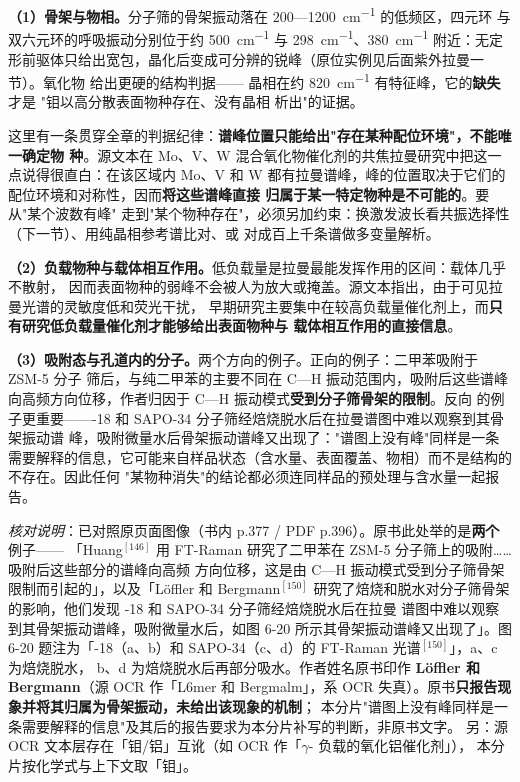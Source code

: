 \textbf{（1）骨架与物相。}分子筛的骨架振动落在 $200$—\qty{1200}{cm^{-1}} 的低频区，四元环
与双六元环的呼吸振动分别位于约 \qty{500}{cm^{-1}} 与 \qty{298}{cm^{-1}}、\qty{380}{cm^{-1}}
附近：无定形前驱体只给出宽包，晶化后变成可分辨的锐峰（原位实例见后面紫外拉曼一节）。氧化物
给出更硬的结构判据—— 晶相在约 \qty{820}{cm^{-1}} 有特征峰，它的\textbf{缺失}才是
"钼以高分散表面物种存在、没有晶相  析出"的证据。

这里有一条贯穿全章的判据纪律：\textbf{谱峰位置只能给出"存在某种配位环境"，不能唯一确定物
种}。源文本在 Mo、V、W 混合氧化物催化剂的共焦拉曼研究中把这一点说得很直白：在该区域内
Mo、V 和 W 都有拉曼谱峰，峰的位置取决于它们的配位环境和对称性，因而\textbf{将这些谱峰直接
归属于某一特定物种是不可能的}。要从"某个波数有峰"
走到"某个物种存在"，必须另加约束：换激发波长看共振选择性（下一节）、用纯晶相参考谱比对、或
对成百上千条谱做多变量解析。

\textbf{（2）负载物种与载体相互作用。}低负载量是拉曼最能发挥作用的区间：载体几乎不散射，
因而表面物种的弱峰不会被人为放大或掩盖。源文本指出，由于可见拉曼光谱的灵敏度低和荧光干扰，
早期研究主要集中在较高负载量催化剂上，而\textbf{只有研究低负载量催化剂才能够给出表面物种与
载体相互作用的直接信息}。

\textbf{（3）吸附态与孔道内的分子。}两个方向的例子。正向的例子：二甲苯吸附于 ZSM-5 分子
筛后，与纯二甲苯的主要不同在 C—H 振动范围内，吸附后这些谱峰向高频方向位移，作者归因于
C—H 振动模式\textbf{受到分子筛骨架的限制}。反向
的例子更重要——-18 和 SAPO-34 分子筛经焙烧脱水后在拉曼谱图中难以观察到其骨架振动谱
峰，吸附微量水后骨架振动谱峰又出现了："谱图上没有峰"同样是一条
需要解释的信息，它可能来自样品状态（含水量、表面覆盖、物相）而不是结构的不存在。因此任何
"某物种消失"的结论都必须连同样品的预处理与含水量一起报告。

\emph{核对说明}：已对照原页面图像（书内 p.377 / PDF p.396）。原书此处举的是\textbf{两个}例子——
「Huang$^{[146]}$ 用 FT-Raman 研究了二甲苯在 ZSM-5 分子筛上的吸附……吸附后这些部分的谱峰向高频
方向位移，这是由 C—H 振动模式受到分子筛骨架限制而引起的」，以及「Löffler 和 Bergmann$^{[150]}$
研究了焙烧和脱水对分子筛骨架的影响，他们发现 -18 和 SAPO-34 分子筛经焙烧脱水后在拉曼
谱图中难以观察到其骨架振动谱峰，吸附微量水后，如图 6-20 所示其骨架振动谱峰又出现了」。图 6-20
题注为「-18（a、b）和 SAPO-34（c、d）的 FT-Raman 光谱$^{[150]}$」，a、c 为焙烧脱水，
b、d 为焙烧脱水后再部分吸水。作者姓名原书印作 \textbf{Löffler 和 Bergmann}（源 OCR 作「L6mer
和 Bergmalm」，系 OCR 失真）。原书\textbf{只报告现象并将其归属为骨架振动，未给出该现象的机制}；
本分片"谱图上没有峰同样是一条需要解释的信息"及其后的报告要求为本分片补写的判断，非原书文字。
另：源 OCR 文本层存在「钼/铝」互讹（如 OCR 作「$\gamma$- 负载的氧化铝催化剂」），
本分片按化学式与上下文取「钼」。

